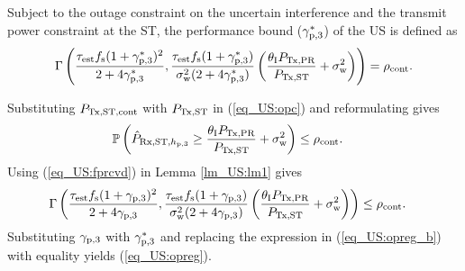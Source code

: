 \begin{coro} \label{cor_US:cor1}
\normalfont
Subject to the outage constraint on the uncertain interference and the transmit power constraint at the ST, the performance bound (${\gamma}_{\text{p,3}}^*$) of the US is defined as %
\begin{align}
\Gamma\left(\frac{\tau_{\text{est}} f_{\text{s}} (1 + {\gamma}_{\text{p,3}}^*)^2}{2 + 4 {\gamma}_{\text{p,3}}^*}, \frac{\tau_{\text{est}} f_{\text{s}} (1  + {\gamma}_{\text{p,3}}^*)}{\sigma^2_{\text{w}} (2 + 4 {\gamma}_{\text{p,3}}^*)} \left( \frac{\theta_{\text{I}} P_{\text{Tx,PR}}}{P_{\text{Tx,ST}}} + \sigma^2_{\text{w}}  \right)  \right) = \rho_{\text{cont}}. \label{eq_US:opreg}  
\end{align}
\end{coro}
\begin{IEEEproof}[Solution]
Substituting $P_{\text{Tx,ST,cont}}$ with $P_{\text{Tx,ST}}$ in (\ref{eq_US:opc}) and reformulating gives 
\begin{align}
\mathbb P\left( \hat{P}_{\text{Rx,ST,$h_{\text{p,3}}$}} \ge \frac{\theta_{\text{I}} P_{\text{Tx,PR}}}{P_{\text{Tx,ST}}} + \sigma^2_{\text{w}} \right) &\le \rho_{\text{cont}}. \label{eq_US:opreg_a} 
\end{align}
Using (\ref{eq_US:fprcvd}) in Lemma \ref{lm_US:lm1} gives
\begin{align}
\Gamma\left(\frac{\tau_{\text{est}} f_{\text{s}} (1 + {\gamma}_{\text{p,3}})^2}{2 + 4 {\gamma}_{\text{p,3}}}, \frac{\tau_{\text{est}} f_{\text{s}} (1  + {\gamma}_{\text{p,3}})}{\sigma^2_{\text{w}} (2 + 4 {\gamma}_{\text{p,3}})} \left( \frac{\theta_{\text{I}} P_{\text{Tx,PR}}}{P_{\text{Tx,ST}}} + \sigma^2_{\text{w}}  \right)  \right) &\le \rho_{\text{cont}}. \label{eq_US:opreg_b} 
\end{align}
Substituting ${\gamma}_{\text{p,3}}$ with ${\gamma}_{\text{p,3}}^*$ and replacing the expression in (\ref{eq_US:opreg_b}) with equality yields (\ref{eq_US:opreg}). 
\end{IEEEproof}

